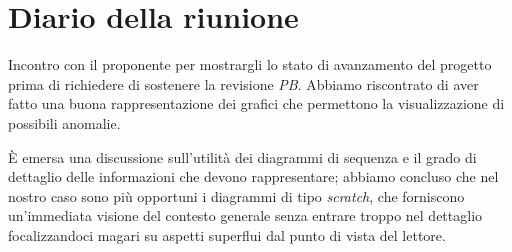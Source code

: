 \section{Diario della riunione}
Incontro con il proponente per mostrargli lo stato di avanzamento del progetto prima di richiedere di sostenere la revisione \textit{PB}. Abbiamo riscontrato di aver fatto una buona rappresentazione dei grafici che permettono la visualizzazione di possibili anomalie.

È emersa una discussione sull'utilità dei diagrammi di sequenza e il grado di dettaglio delle informazioni che devono rappresentare; abbiamo concluso che nel nostro caso sono più opportuni i diagrammi di tipo \textit{scratch}, che forniscono un'immediata visione del contesto generale senza entrare troppo nel dettaglio focalizzandoci magari su aspetti superflui dal punto di vista del lettore.
